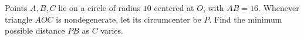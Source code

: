 Points $A,B,C$ lie on a circle of radius $10$ centered at $O$, with $AB=16$. Whenever triangle $AOC$ is nondegenerate, let its circumcenter be $P$. Find the minimum possible distance $PB$ as $C$ varies.
